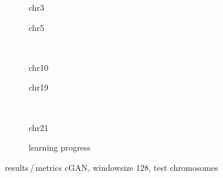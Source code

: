 \begin{figure}[p]
    \begin{subfigure}{0.45\textwidth}
        \scriptsize
        \caption{chr3}
    \end{subfigure} \hfill
    \begin{subfigure}{0.45\textwidth}
        \scriptsize
        \caption{chr5}
    \end{subfigure}\\[5mm]
    \begin{subfigure}{0.45\textwidth}
        \scriptsize
        \caption{chr10}
    \end{subfigure}\hfill
    \begin{subfigure}{0.45\textwidth}
        \scriptsize
        \caption{chr19}
    \end{subfigure}\\[3mm]
    \centering
    \begin{subfigure}{0.45\textwidth}
        \scriptsize
        \caption{chr21}
    \end{subfigure} \hfill
    \begin{subfigure}{0.45\textwidth}
        \scriptsize
        \caption{learning progress} \label{fig:results:GAN128_lossEpochs}
    \end{subfigure}
    \caption{results\,/\,metrics cGAN, windowsize 128, test chromosomes}   \label{fig:results:GAN128_pearson}
\end{figure}


